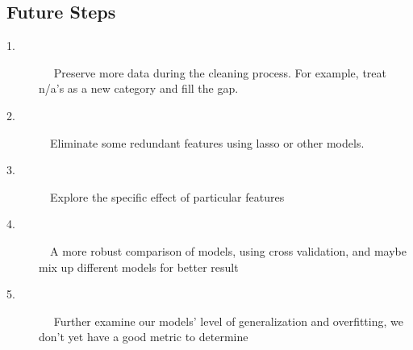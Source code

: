 \documentclass[forprint]{mytemplate}
\begin{document}
\begin{multicols}{2}
\section{\color{blue}Future Steps}
\begin{description}
  \item[1.]~~ Preserve more data during the cleaning process. For example, treat n/a's as a new category and fill the gap.
  \item[2.] ~~Eliminate some redundant features using lasso or other models.
  \item[3.] ~~Explore the specific effect of particular features
  \item[4.] ~~A more robust comparison of models, using cross validation, and maybe mix up different models for better result
  \item[5.]~~ Further examine our models' level of generalization and overfitting, we don't yet have a good metric to determine
\end{description}
 \end{multicols}
\end{document}

